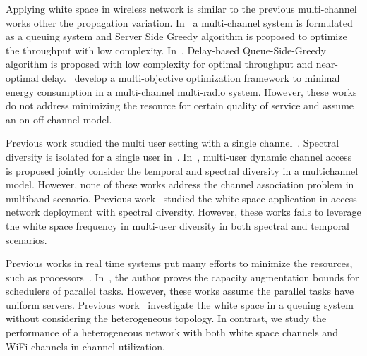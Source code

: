 Applying white space in wireless network is similar to the previous multi-channel works other the 
propagation variation. In~\cite{bodas2012low} a multi-channel system is formulated as a queuing 
system and Server Side Greedy algorithm is proposed to optimize the throughput with low complexity. 
In~\cite{ji2013performance}, Delay-based Queue-Side-Greedy algorithm is proposed with low complexity 
for optimal throughput and near-optimal delay.~\cite{liu2014energy} develop a multi-objective optimization 
framework to minimal energy consumption in a multi-channel multi-radio system. 
However, these works do not address minimizing the resource for certain quality of service and assume an 
on-off channel model.

Previous work studied the multi user setting with a single channel~\cite{tan2010distributed}. 
Spectral diversity is isolated for a single user in~\cite{shu2009throughput}. In~\cite{liu2013stay}, 
multi-user dynamic channel access is proposed jointly consider the temporal and spectral diversity in a multichannel model. However, 
none of these works address the channel association problem in multiband scenario.
Previous work~\cite{pcuiwinmee} studied the 
white space application in access network deployment with spectral diversity. However, these works 
fails to leverage the white space frequency in multi-user diversity in both spectral and temporal scenarios.

Previous works in real time systems put many efforts to minimize the resources, such as processors~\cite{nelissen2012techniques}.
In~\cite{li2014analysis}, the author proves the capacity augmentation bounds for schedulers of parallel tasks. 
However, these works assume the parallel tasks have uniform servers. 
Previous work~\cite{chen2011feasibility} investigate the white space in a queuing system without considering the 
heterogeneous topology.
In contrast, we study the performance of a heterogeneous network with both white space channels 
and WiFi channels in channel utilization. 



